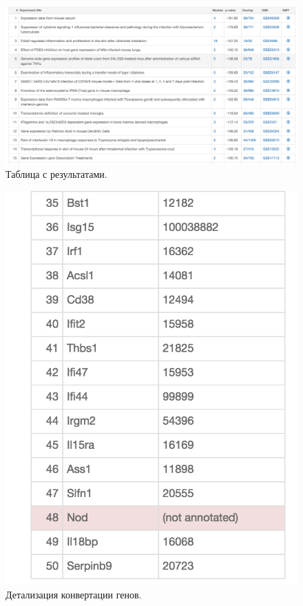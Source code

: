 \documentclass[10pt,pdf,utf8,russian,aspectratio=169]{beamer}
\begin{document}
\begin{frame}
    \begin{figure}[p]
        \centering
        \caption{Таблица с результатами.}
        \includegraphics[height=0.9\textheight]{./img/screen_results.png}
    \end{figure}
\end{frame}

\begin{frame}
    \begin{figure}[p]
        \centering
        \caption{Детализация конвертации генов.}
        \includegraphics[height=0.9\textheight]{./img/screen_details.png}
    \end{figure}
\end{frame}
\end{document}
